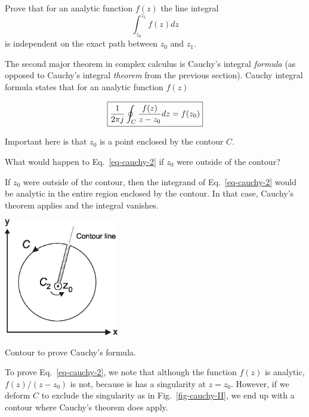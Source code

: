\begin{exer}
Prove that for an analytic function $f(z)$ the line integral 
$$\int_{z_0}^{z_1}f(z)dz$$
is independent on the exact path between $z_0$ and $z_1$.
\end{exer}


\pagebreak



The second major theorem in complex calculus is Cauchy's integral \emph{formula} (as opposed to Cauchy's integral \emph{theorem} from the previous section). Cauchy integral formula states that for an analytic function $f(z)$

\begin{equation}
\fbox{$\displaystyle
\frac{1}{2 \pi j}\oint_{{C}} \frac{f(z)} {z-z_0} dz = f(z_0)
\label{eq-cauchy-2}
$}
\end{equation}

Important here is that $z_0$ is a point enclosed by the contour ${C}$.

\begin{cue}
What would happen to Eq.~\ref{eq-cauchy-2} if  $z_0$ were outside of the contour?  
\end{cue}

If $z_0$ were outside of the contour, then the integrand of Eq.~\ref{eq-cauchy-2} would be analytic in the entire region enclosed by the contour. In that case, Cauchy's theorem applies and the integral vanishes.

\begin{marginfigure}[-1cm]
\centering
\includegraphics[width=5cm]{complex/figures/cauchy_II}
\caption{Contour to prove Cauchy's formula.}
\label{fig-cauchy-II}
\end{marginfigure}

To prove Eq.~\ref{eq-cauchy-2}, we note that although the function $f(z)$ is analytic, $f(z)/(z-z_0)$ is not, because is has a singularity at $z=z_0$. However, if we deform ${C}$ to exclude the singularity as in Fig.~\ref{fig-cauchy-II}, we end up with a contour where Cauchy's theorem does apply.

